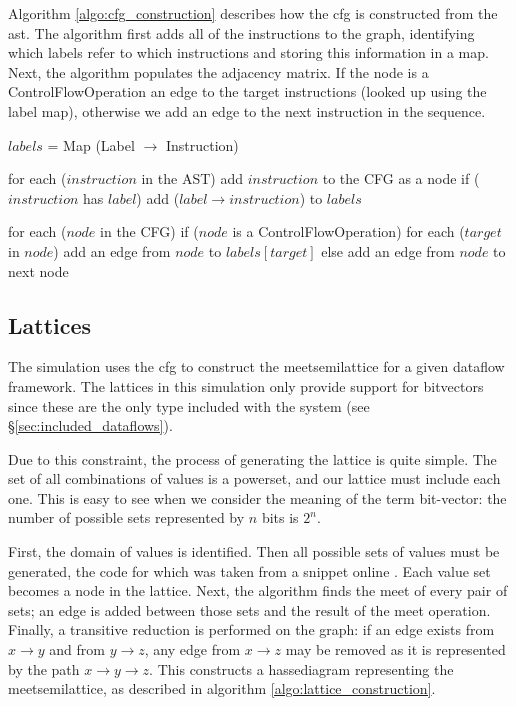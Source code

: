 \documentclass[bsc,twoside,singlespacing,parskip,logo,notimes,normalheadings]{infthesis}
\begin{document}
        Algorithm \ref{algo:cfg_construction} describes how the
        \gls{cfg} is constructed from the \gls{ast}. The algorithm
        first adds all of the instructions to the graph, identifying
        which labels refer to which instructions and storing this
        information in a map. Next, the algorithm populates the
        adjacency matrix. If the node is a ControlFlowOperation an
        edge to the target instructions (looked up using the label
        map), otherwise we add an edge to the next instruction in the
        sequence.

        \begin{algorithm}[caption={Constructing a \gls{cfg} from an \gls{ast} for an \gls{iloc} program.}, label={algo:cfg_construction},mathescape=true]
$labels$ = Map (Label $\rightarrow$ Instruction)

for each ($instruction$ in the AST)
    add $instruction$ to the CFG as a node
    if ($instruction$ has $label$)
       add ($label \rightarrow instruction$) to $labels$

for each ($node$ in the CFG)
    if ($node$ is a ControlFlowOperation)
       for each ($target$ in $node$)
           add an edge from $node$ to $labels[target]$
    else
       add an edge from $node$ to next node
        \end{algorithm}

        \subsection{Lattices}\label{sec:impl_lattice}
        The simulation uses the \gls{cfg} to construct the
        \gls{meetsemilattice} for a given \gls{dataflow}
        framework. The lattices in this simulation only provide
        support for \gls{bitvector}s since these are the only type
        included with the system (see \S\ref{sec:included_dataflows}).

        Due to this constraint, the process of generating the lattice
        is quite simple. The set of all combinations of values is a
        powerset, and our lattice must include each one. This is easy
        to see when we consider the meaning of the term bit-vector:
        the number of possible sets represented by $n$ bits is $2^n$.

        First, the domain of values is identified. Then all possible
        sets of values must be generated, the code for which was taken
        from a snippet online %
        \cite{snippet:combinations}. Each value set becomes a node in
        the lattice. Next, the algorithm finds the meet of every pair
        of sets; an edge is added between those sets and the result of
        the meet operation. Finally, a transitive reduction is
        performed on the graph: if an edge exists from
        $x \rightarrow y$ and from $y \rightarrow z$, any edge from
        $x \rightarrow z$ may be removed as it is represented by the
        path $x \rightarrow y \rightarrow z$. This constructs a
        \gls{hassediagram} representing the \gls{meetsemilattice}, as
        described in algorithm \ref{algo:lattice_construction}.
\end{document}
